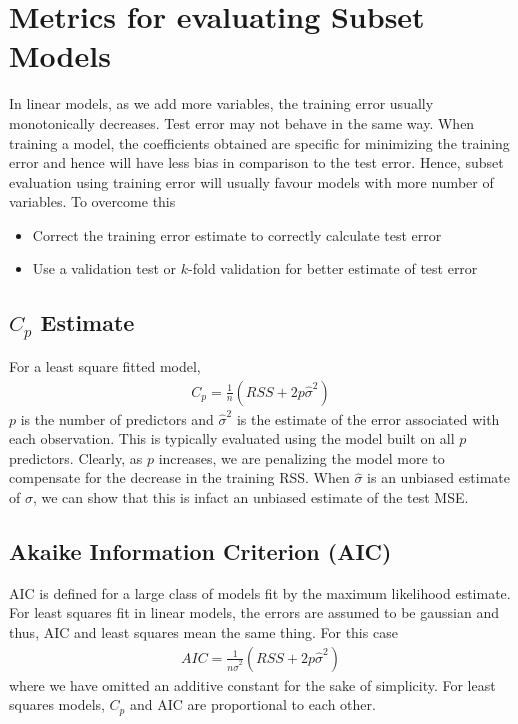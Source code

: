 \documentclass[../statistical_learning_notes.tex]{subfiles}
\begin{document}
    \section{Metrics for evaluating Subset Models}
    In linear models, as we add more variables, the training error usually monotonically decreases. Test error may not behave in the same way. When training a model, the coefficients obtained are specific for minimizing the training error and hence will have less bias in comparison to the test error. \newline
    Hence, subset evaluation using training error will usually favour models with more number of variables. To overcome this
    \begin{itemize}
        \item Correct the training error estimate to correctly calculate test error
        \item Use a validation test or $k$-fold validation for better estimate of test error
    \end{itemize}
    
    \subsection{$C_{p}$ Estimate}
    For a least square fitted model,
    \begin{align*}
        C_{p} = \frac{1}{n}(RSS + 2p\hat{\sigma}^{2})
    \end{align*}
    $p$ is the number of predictors and $\hat{\sigma}^{2}$ is the estimate of the error associated with each observation. This is typically evaluated using the model built on all $p$ predictors.\newline
    Clearly, as $p$ increases, we are penalizing the model more to compensate for the decrease in the training RSS. When $\hat{\sigma}$ is an unbiased estimate of $\sigma$, we can show that this is infact an unbiased estimate of the test MSE.


    \subsection{Akaike Information Criterion (AIC)}
    AIC is defined for a large class of models fit by the maximum likelihood estimate.\newline
    For least squares fit in linear models, the errors are assumed to be gaussian and thus, AIC and least squares mean the same thing. For this case
    \begin{align*}
        AIC = \frac{1}{n\hat{\sigma}^2}(RSS + 2p\hat{\sigma}^2)
    \end{align*}
    where we have omitted an additive constant for the sake of simplicity.\newline
    For least squares models, $C_{p}$ and AIC are proportional to each other.
\end{document}
